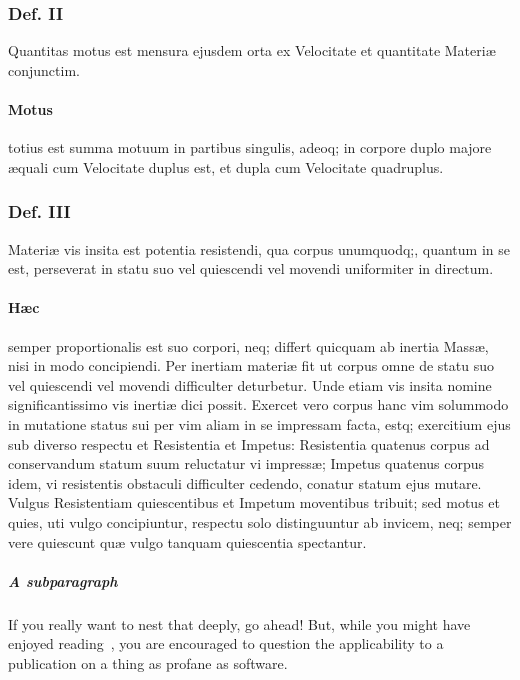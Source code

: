 \documentclass{ansarticle}
\begin{document}
\subsubsection{Def. II}
Quantitas motus est mensura ejusdem orta ex Velocitate et quantitate
Materi\ae{} conjunctim.

\paragraph{Motus}
totius est summa motuum in partibus singulis, adeoq; in corpore duplo
majore \ae{}quali cum Velocitate duplus est, et dupla cum Velocitate
quadruplus.

\subsubsection{Def. III}
Materi\ae{} vis insita est potentia resistendi, qua corpus unumquodq;,
quantum in se est, perseverat in statu suo vel quiescendi vel movendi
uniformiter in directum.

\paragraph{H\ae{}c}
semper proportionalis est suo corpori, neq; differt quicquam ab
inertia Mass\ae{}, nisi in modo concipiendi. Per inertiam materi\ae{} fit ut
corpus omne de statu suo vel quiescendi vel movendi difficulter
deturbetur. Unde etiam vis insita nomine significantissimo vis inerti\ae{}
dici possit. Exercet vero corpus hanc vim solummodo in mutatione
status sui per vim aliam in se impressam facta, estq; exercitium ejus
sub diverso respectu et Resistentia et Impetus: Resistentia quatenus
corpus ad conservandum statum suum reluctatur vi impress\ae{}; Impetus
quatenus corpus idem, vi resistentis obstaculi difficulter cedendo,
conatur statum ejus mutare. Vulgus Resistentiam quiescentibus et
Impetum moventibus tribuit; sed motus et quies, uti vulgo
concipiuntur, respectu solo distinguuntur ab invicem, neq; semper vere
quiescunt qu\ae{} vulgo tanquam quiescentia spectantur.

\subparagraph{A subparagraph} If you really want to nest that deeply, go
ahead! But, while you might have enjoyed
reading~\cite{Wittgenstein21,Wittgenstein81}, you are encouraged to
question the applicability to a publication on a thing as profane as
software.



\end{document}
